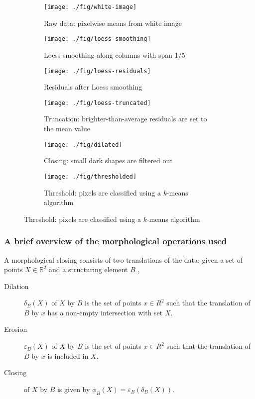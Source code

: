 \documentclass[10pt,fleqn]{article}
\begin{document}
\begin{figure}[!h]
\caption{Stages in identification of spots on beryllium screen}
\centering

\begin{subfigure}{0.32\textwidth}
\caption{Raw data: pixelwise means from white image}
\texttt{[image: ./fig/white-image]}
\end{subfigure}
%
\begin{subfigure}{0.32\textwidth}
\caption{Loess smoothing along columns with span 1/5}
\texttt{[image: ./fig/loess-smoothing]}
\end{subfigure}
%
\begin{subfigure}{0.32\textwidth}
\caption{Residuals after Loess smoothing}
\texttt{[image: ./fig/loess-residuals]}
\end{subfigure}
%
\begin{subfigure}{0.32\textwidth}
\caption{Truncation: brighter-than-average residuals are set to the mean value}
\texttt{[image: ./fig/loess-truncated]}
\end{subfigure}
%
\begin{subfigure}{0.32\textwidth}
\caption{Closing: small dark shapes are filtered out}
\texttt{[image: ./fig/dilated]}
\end{subfigure}
%
\begin{subfigure}{0.32\textwidth}
\caption{Threshold: pixels are classified using a $k$-means algorithm}
\texttt{[image: ./fig/thresholded]}
\end{subfigure}
\end{figure}

\subsubsection*{A brief overview of the morphological operations used}
A morphological closing consists of two translations of the data: given a set of points $X \in \mathbb{R}^2$ and a structuring element $B$ \cite{Vincent1997},

\begin{description}
\item[Dilation] $\delta_B(X)$ of $X$ by $B$ is the set of points $x \in R^2$ such that the translation of $B$ by $x$ has a non-empty intersection with set $X$.
\item[Erosion] $\varepsilon_B(X)$ of $X$ by $B$ is the set of points $x \in R^2$ such that the translation of $B$ by $x$ is included in $X$.
\item[Closing] of $X$ by $B$ is given by $\phi_B(X) = \varepsilon_B(\delta_B(X))$.
\end{description}
\end{document}
